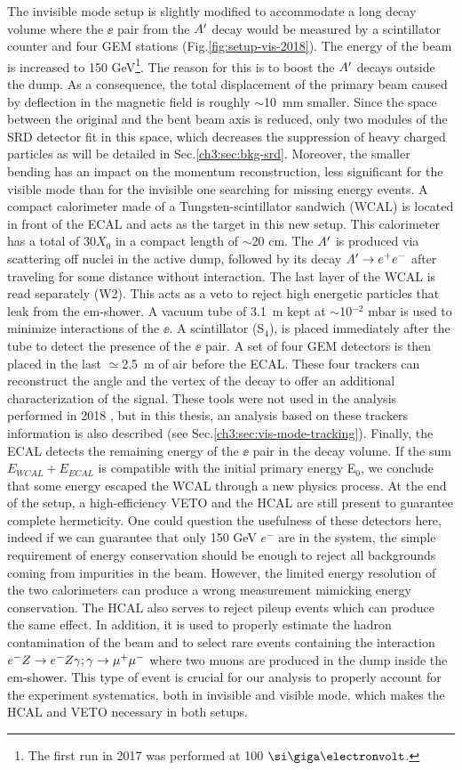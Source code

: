The invisible mode setup is slightly modified to accommodate a long decay volume where the $\ee$ pair from the $A'$ decay would be measured by a scintillator counter and four GEM stations (Fig.\ref{fig:setup-vis-2018}). The energy of the beam is increased to 150 GeV\footnote{The first run in 2017 was performed at 100 $\gev$.}. The reason for this is to boost the $A'$ decays outside the dump. As a consequence, the total displacement of the primary beam caused by deflection in the magnetic field is roughly $\sim$\SI{10}{\milli\meter} smaller. Since the space between the original and the bent beam axis is reduced, only two modules of the SRD detector fit in this space, which decreases the suppression of heavy charged particles as will be detailed in Sec.\ref{ch3:sec:bkg-srd}. Moreover, the smaller bending has an impact on the momentum reconstruction, less significant for the visible mode than for the invisible one searching for missing energy events. A compact calorimeter made of a Tungsten-scintillator sandwich (WCAL) is located in front of the ECAL and acts as the target in this new setup. This calorimeter has a total of 30$X_0$ in a compact length of $\sim$20 \si{cm}. The $A'$ is produced via scattering off nuclei in the active dump, followed by its decay $A' \to e^+e^-$ after traveling for some distance without interaction. The last layer of the WCAL is read separately (W2). This acts as a veto to reject high energetic particles that leak from the em-shower. A vacuum tube of \SI{3.1}{m} kept at $\sim$10$^{-2}$ \si{mbar} is used to minimize interactions of the $\ee$. A scintillator (S$_4$), is placed immediately after the tube to detect the presence of the $\ee$ pair. A set of four GEM detectors is then placed in the last $\simeq$\SI{2.5}{m} of air before the ECAL. These four trackers can reconstruct the angle and the vertex of the decay to offer an additional characterization of the signal. These tools were not used in the analysis performed in 2018 \cite{Banerjee:2019hmi}, but in this thesis, an analysis based on these trackers information is also described (see Sec.\ref{ch3:sec:vis-mode-tracking}). Finally, the ECAL detects the remaining energy of the $\ee$ pair in the decay volume. If the sum $E_{WCAL}+E_{ECAL}$ is compatible with the initial primary energy E$_0$, we conclude that some energy escaped the WCAL through a new physics process. At the end of the setup, a high-efficiency VETO and the HCAL are still present to guarantee complete hermeticity. One could question the usefulness of these detectors here, indeed if we can guarantee that only 150 GeV $e^-$ are in the system, the simple requirement of energy conservation should be enough to reject all backgrounds coming from impurities in the beam. However, the limited energy resolution of the two calorimeters can produce a wrong measurement mimicking energy conservation. The HCAL also serves to reject pileup events which can produce the same effect. In addition, it is used to properly estimate the hadron contamination of the beam and to select rare events containing the interaction $e^- Z \to e^- Z \gamma; \gamma \to \mu^+ \mu^-$ where two muons are produced in the dump inside the em-shower. This type of event is crucial for our analysis to properly account for the experiment systematics, both in invisible and visible mode, which makes the HCAL and VETO necessary in both setups.


